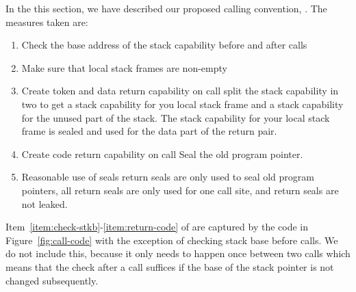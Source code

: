 \documentclass[acmsmall,review,anonymous]{acmart}\settopmatter{printfolios=true,printccs=false,printacmref=false}
\begin{document}
In the this section, we have described our proposed calling convention, \stktokens{}. The measures taken are:
\begin{enumerate}
\item \label{item:check-stkb} Check the base address of the stack capability before and after calls
\item \label{item:non-empty-sf} Make sure that local stack frames are non-empty
\item \label{item:return-data} Create token and data return capability on call split the stack capability in two to get a stack capability for you local stack frame and a stack capability for the unused part of the stack. The stack capability for your local stack frame is sealed and used for the data part of the return pair.
\item \label{item:return-code} Create code return capability on call Seal the old program pointer.
\item Reasonable use of seals return seals are only used to seal old program pointers, all return seals are only used for one call site, and return seals are not leaked.
\end{enumerate}
Item~\ref{item:check-stkb}-\ref{item:return-code} of \stktokens{} are captured by the code in Figure~\ref{fig:call-code} with the exception of checking stack base before calls. We do not include this, because it only needs to happen once between two calls which means that the check after a call suffices if the base of the stack pointer is not changed subsequently.
\end{document}
